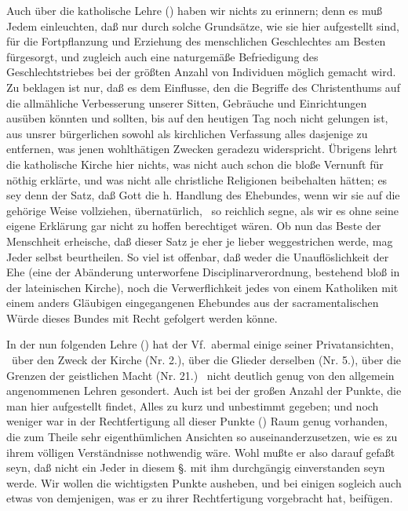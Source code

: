 Auch über die katholische Lehre  () haben wir nichts zu erinnern; denn es muß Jedem einleuchten, daß nur durch solche Grundsätze, wie sie hier aufgestellt sind, für die Fortpflanzung und Erziehung des menschlichen Geschlechtes am Besten fürgesorgt, und zugleich auch eine naturgemäße Befriedigung des Geschlechtstriebes bei der größten Anzahl von Individuen möglich gemacht wird. Zu beklagen ist nur, daß es dem Einflusse, den die Begriffe des Christenthums auf die allmähliche Verbesserung unserer Sitten, Gebräuche und Einrichtungen ausüben könnten und sollten, bis auf den heutigen Tag noch nicht gelungen ist, aus unsrer bürgerlichen sowohl als kirchlichen Verfassung alles dasjenige zu entfernen, was jenen wohlthätigen Zwecken geradezu widerspricht. Übrigens lehrt die katholische Kirche hier nichts, was nicht auch schon die bloße Vernunft für nöthig erklärte, und was nicht alle christliche Religionen beibehalten hätten; es sey denn der Satz, daß Gott die h. Handlung des Ehebundes, wenn wir sie auf die gehörige Weise vollziehen, übernatürlich, \dh\  so reichlich segne, als wir es ohne seine eigene Erklärung gar nicht zu hoffen berechtiget wären. Ob nun das Beste der Menschheit erheische, daß dieser Satz je eher je lieber weggestrichen werde, mag Jeder selbst beurtheilen. So viel ist offenbar, daß weder die Unauflöslichkeit der Ehe (eine der Abänderung unterworfene Disciplinarverordnung, bestehend bloß in der lateinischen Kirche), noch die Verwerflichkeit jedes von einem Katholiken mit einem anders Gläubigen eingegangenen Ehebundes aus der sacramentalischen Würde dieses Bundes mit Recht gefolgert werden könne. \par
In der nun folgenden Lehre  () hat der Vf.\ abermal einige seiner Privatansichten, \zB\ über den Zweck der Kirche (Nr. 2.), über die Glieder derselben (Nr. 5.), über die Grenzen der geistlichen Macht (Nr. 21.) \umA\  nicht deutlich genug von den allgemein angenommenen Lehren gesondert. Auch ist bei der großen Anzahl der Punkte, die man hier aufgestellt findet, Alles zu kurz und unbestimmt gegeben; und noch weniger war in der Rechtfertigung all dieser Punkte () Raum genug vorhanden, die zum Theile sehr eigenthümlichen Ansichten so auseinanderzusetzen, wie es zu ihrem völligen Verständnisse nothwendig wäre. Wohl mußte er also darauf gefaßt seyn, daß nicht ein Jeder in diesem §. mit ihm durchgängig einverstanden seyn werde. Wir wollen die wichtigsten Punkte ausheben, und bei einigen sogleich auch etwas von demjenigen, was er zu ihrer Rechtfertigung vorgebracht hat, beifügen. \par
